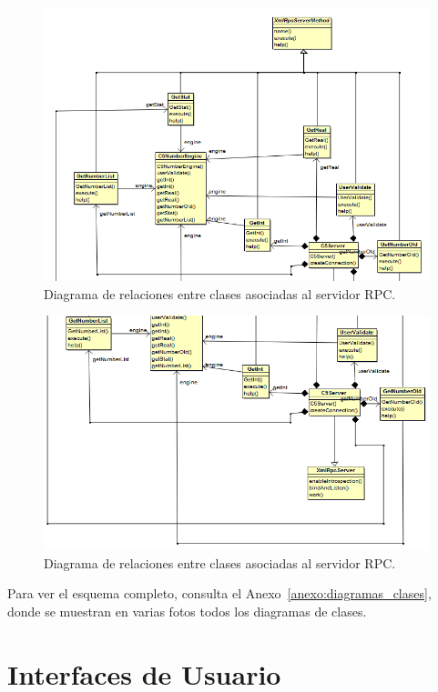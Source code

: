 \documentclass[a4paper,12pt]{article}
\begin{document}
\begin{figure}[htbp]
    \centering
    \includegraphics[width=\textwidth]{C5/Esquema_general_C5_server_server_1.PNG}
    \caption{Diagrama de relaciones entre clases asociadas al servidor RPC.}
    \label{fig:relaciones_rpc1}
\end{figure}

\begin{figure}[htbp]
    \centering
    \includegraphics[width=\textwidth]{C5/Esquema_general_C5_server_server_2.PNG}
    \caption{Diagrama de relaciones entre clases asociadas al servidor RPC.}
    \label{fig:relaciones_rpc2}
\end{figure}

Para ver el esquema completo, consulta el Anexo~\ref{anexo:diagramas_clases},
donde se muestran en varias fotos todos los diagramas de clases.

\newpage
\section{Interfaces de Usuario}
\end{document}
